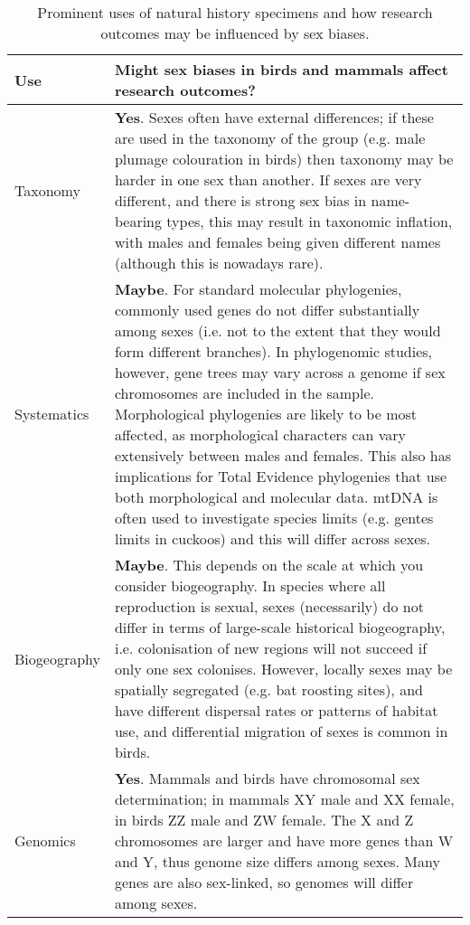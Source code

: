 
\begin{longtable}{p{3cm} p{16cm}}

\caption{Prominent uses of natural history specimens and how research outcomes may be influenced by sex biases.}\\ 
  
  \hline
  \textbf{Use} & \textbf{Might sex biases in birds and mammals affect research outcomes?}\\ 

  \hline
  Taxonomy & \textbf{Yes}. Sexes often have external differences; if these are used in the taxonomy of the group (e.g. male plumage colouration in birds\cite{paxton2009utility}) then taxonomy may be harder in one sex than another. If sexes are very different, and there is strong sex bias in name-bearing types, this may result in taxonomic inflation, with males and females being given different names (although this is nowadays rare).\\ 

  Systematics & \textbf{Maybe}. For standard molecular phylogenies, commonly used genes do not differ substantially among sexes (i.e. not to the extent that they would form different branches). In phylogenomic studies, however, gene trees may vary across a genome if sex chromosomes are included in the sample\cite{reddy2017}. Morphological phylogenies are likely to be most affected, as morphological characters can vary extensively between males and females. This also has implications for Total Evidence phylogenies that use both morphological and molecular data. mtDNA is often used to investigate species limits (e.g. gentes limits in cuckoos\cite{soler2009geographic}) and this will differ across sexes.\\ 

  Biogeography & \textbf{Maybe}. This depends on the scale at which you consider biogeography. In species where all reproduction is sexual, sexes (necessarily) do not differ in terms of large-scale historical biogeography, i.e. colonisation of new regions will not succeed if only one sex colonises. However, locally sexes may be spatially segregated (e.g. bat roosting sites\cite{altringham}), and have different dispersal rates\cite{pusey1987sex} or patterns of habitat use, and differential migration of sexes is common in birds\cite{Woodworth2016}.\\ 

  Genomics & \textbf{Yes}. Mammals and birds have chromosomal sex determination; in mammals XY male and XX female, in birds ZZ male and ZW female\cite{stevens1997sex}. The X and Z chromosomes are larger and have more genes than W and Y, thus genome size differs among sexes. Many genes are also sex-linked, so genomes will differ among sexes.\\ 


\end{longtable}
